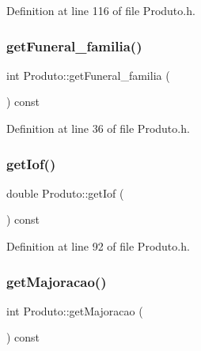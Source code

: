Definition at line 116 of file Produto.\+h.

\hypertarget{class_produto_a9ef9eda75c2e2787630f390767b4bff1}{}\label{class_produto_a9ef9eda75c2e2787630f390767b4bff1} 
\subsubsection{\texorpdfstring{get\+Funeral\+\_\+familia()}{getFuneral\_familia()}}
{\footnotesize\ttfamily int Produto\+::get\+Funeral\+\_\+familia (\begin{DoxyParamCaption}{ }\end{DoxyParamCaption}) const\hspace{0.3cm}{\ttfamily [inline]}}



Definition at line 36 of file Produto.\+h.

\hypertarget{class_produto_a47402c721426916109ac8ed35e4795ff}{}\label{class_produto_a47402c721426916109ac8ed35e4795ff} 
\subsubsection{\texorpdfstring{get\+Iof()}{getIof()}}
{\footnotesize\ttfamily double Produto\+::get\+Iof (\begin{DoxyParamCaption}{ }\end{DoxyParamCaption}) const\hspace{0.3cm}{\ttfamily [inline]}}



Definition at line 92 of file Produto.\+h.

\hypertarget{class_produto_a1bd6a841c396cf5a079033b96b549c54}{}\label{class_produto_a1bd6a841c396cf5a079033b96b549c54} 
\subsubsection{\texorpdfstring{get\+Majoracao()}{getMajoracao()}}
{\footnotesize\ttfamily int Produto\+::get\+Majoracao (\begin{DoxyParamCaption}{ }\end{DoxyParamCaption}) const\hspace{0.3cm}{\ttfamily [inline]}}



